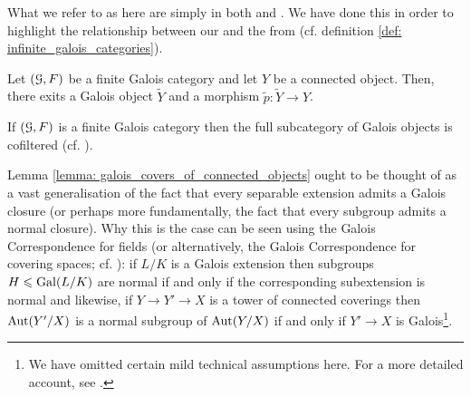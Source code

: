                 \begin{remark}
                    What we refer to as  here are simply  in both \cite[Expos\'e V]{SGA1} and \cite[\href{https://stacks.math.columbia.edu/tag/0BMQ}{Tag 0BMQ}]{stacks}. We have done this in order to highlight the relationship between our  and the  from \cite[Section 7]{bhatt_scholze_2014_pro_etale} (cf. definition \ref{def: infinite_galois_categories}).
                \end{remark}
                
                \begin{lemma} \label{lemma: galois_covers_of_connected_objects}
                    \cite[\href{https://stacks.math.columbia.edu/tag/0BN2}{Tag 0BN2}]{stacks} Let $(\mathcal{G}, F)$ be a finite Galois category and let $Y$ be a connected object. Then, there exits a Galois object $\tilde{Y}$ and a morphism $\tilde{p}: \tilde{Y} \to Y$.
                \end{lemma} 
                \begin{corollary} \label{coro: cofiltered_diagrams_of_Galois_objects_in_a_finite_Galois_category}
                    If $(\mathcal{G}, F)$ is a finite Galois category then the full subcategory of Galois objects is cofiltered (cf. \cite[\href{https://stacks.math.columbia.edu/tag/00D3}{Tag 00D3}]{stacks}).
                \end{corollary}
                \begin{remark}
                    Lemma \ref{lemma: galois_covers_of_connected_objects} ought to be thought of as a vast generalisation of the fact that every separable extension admits a Galois closure (or perhaps more fundamentally, the fact that every subgroup admits a normal closure). Why this is the case can be seen using the Galois Correspondence for fields (or alternatively, the Galois Correspondence for covering spaces; cf. \cite[Theorem 1.38]{hatcher2002algebraic}): if $L/K$ is a Galois extension then subgroups $H \leqslant \mathrm{Gal}(L/K)$ are normal if and only if the corresponding subextension is normal and likewise, if $Y \to Y' \to X$ is a tower of connected coverings then $\mathrm{Aut}(Y'/X)$ is a normal subgroup of $\mathrm{Aut}(Y/X)$ if and only if $Y' \to X$ is Galois\footnote{We have omitted certain mild technical assumptions here. For a more detailed account, see \cite[Section 1.3]{hatcher2002algebraic}.}. 
                \end{remark}

